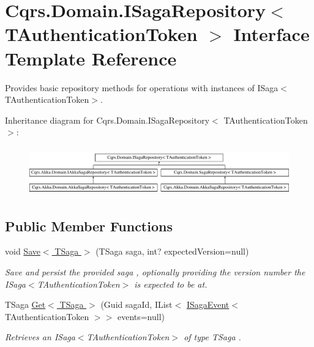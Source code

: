 \hypertarget{interfaceCqrs_1_1Domain_1_1ISagaRepository}{}\section{Cqrs.\+Domain.\+I\+Saga\+Repository$<$ T\+Authentication\+Token $>$ Interface Template Reference}
\label{interfaceCqrs_1_1Domain_1_1ISagaRepository}


Provides basic repository methods for operations with instances of I\+Saga$<$\+T\+Authentication\+Token$>$.  


Inheritance diagram for Cqrs.\+Domain.\+I\+Saga\+Repository$<$ T\+Authentication\+Token $>$\+:\begin{figure}[H]
\begin{center}
\leavevmode
\includegraphics[height=2.137405cm]{interfaceCqrs_1_1Domain_1_1ISagaRepository}
\end{center}
\end{figure}
\subsection*{Public Member Functions}
\begin{DoxyCompactItemize}
\item 
void \hyperlink{interfaceCqrs_1_1Domain_1_1ISagaRepository_ad539cdc70f3168d0335c9510742e25cd_ad539cdc70f3168d0335c9510742e25cd}{Save$<$ T\+Saga $>$} (T\+Saga saga, int? expected\+Version=null)
\begin{DoxyCompactList}\small\item\em Save and persist the provided {\itshape saga} , optionally providing the version number the I\+Saga$<$\+T\+Authentication\+Token$>$ is expected to be at. \end{DoxyCompactList}\item 
T\+Saga \hyperlink{interfaceCqrs_1_1Domain_1_1ISagaRepository_aa3409bf59bbe489afcc89716928e9ad1_aa3409bf59bbe489afcc89716928e9ad1}{Get$<$ T\+Saga $>$} (Guid saga\+Id, I\+List$<$ \hyperlink{interfaceCqrs_1_1Events_1_1ISagaEvent}{I\+Saga\+Event}$<$ T\+Authentication\+Token $>$$>$ events=null)
\begin{DoxyCompactList}\small\item\em Retrieves an I\+Saga$<$\+T\+Authentication\+Token$>$ of type {\itshape T\+Saga} . \end{DoxyCompactList}\end{DoxyCompactItemize}



